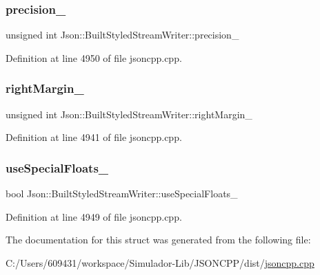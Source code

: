 \subsubsection{\texorpdfstring{precision\+\_\+}{precision\_}}
{\footnotesize\ttfamily unsigned int Json\+::\+Built\+Styled\+Stream\+Writer\+::precision\+\_\+\hspace{0.3cm}{\ttfamily [private]}}



Definition at line 4950 of file jsoncpp.\+cpp.

\hypertarget{struct_json_1_1_built_styled_stream_writer_a06a51521ccae20397f52fe3036edc602}{}\label{struct_json_1_1_built_styled_stream_writer_a06a51521ccae20397f52fe3036edc602} 
\subsubsection{\texorpdfstring{right\+Margin\+\_\+}{rightMargin\_}}
{\footnotesize\ttfamily unsigned int Json\+::\+Built\+Styled\+Stream\+Writer\+::right\+Margin\+\_\+\hspace{0.3cm}{\ttfamily [private]}}



Definition at line 4941 of file jsoncpp.\+cpp.

\hypertarget{struct_json_1_1_built_styled_stream_writer_a6f1b8694b4eb17ab8c34f6d6dd8c8a4a}{}\label{struct_json_1_1_built_styled_stream_writer_a6f1b8694b4eb17ab8c34f6d6dd8c8a4a} 
\subsubsection{\texorpdfstring{use\+Special\+Floats\+\_\+}{useSpecialFloats\_}}
{\footnotesize\ttfamily bool Json\+::\+Built\+Styled\+Stream\+Writer\+::use\+Special\+Floats\+\_\+\hspace{0.3cm}{\ttfamily [private]}}



Definition at line 4949 of file jsoncpp.\+cpp.



The documentation for this struct was generated from the following file\+:\begin{DoxyCompactItemize}
\item 
C\+:/\+Users/609431/workspace/\+Simulador-\/\+Lib/\+J\+S\+O\+N\+C\+P\+P/dist/\hyperlink{jsoncpp_8cpp}{jsoncpp.\+cpp}\end{DoxyCompactItemize}
